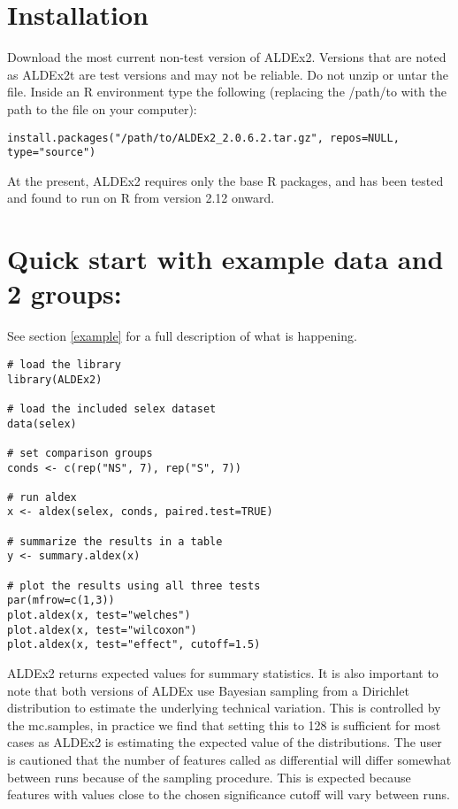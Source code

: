 \documentclass[11pt]{amsart}
\begin{document}
\section{Installation}
Download the most current non-test version of ALDEx2. Versions that are noted as ALDEx2t are test versions and may not be reliable. Do not unzip or untar the file. Inside an R environment type the following  (replacing the /path/to with the path to the file on your computer):
\begin{verbatim}
install.packages("/path/to/ALDEx2_2.0.6.2.tar.gz", repos=NULL, type="source")
\end{verbatim}
At the present, ALDEx2 requires only the base R packages, and has been tested and found to run on R from version 2.12 onward.

\section{Quick start with example data and 2 groups:}
See section \ref{example} for a full description of what is happening.\\
\begin{verbatim}
# load the library
library(ALDEx2)  

# load the included selex dataset
data(selex)  

# set comparison groups
conds <- c(rep("NS", 7), rep("S", 7))  

# run aldex
x <- aldex(selex, conds, paired.test=TRUE)  

# summarize the results in a table
y <- summary.aldex(x)  

# plot the results using all three tests
par(mfrow=c(1,3)) 
plot.aldex(x, test="welches")
plot.aldex(x, test="wilcoxon")
plot.aldex(x, test="effect", cutoff=1.5)
\end{verbatim}

ALDEx2 returns expected values for summary statistics. It is also important to note that both versions of ALDEx use Bayesian sampling from a Dirichlet distribution to estimate  the underlying technical variation. This is controlled by the mc.samples, in practice we find that setting this to 128 is sufficient for most cases as ALDEx2 is estimating the expected value of the distributions. The user is cautioned that the number of features called as differential will differ somewhat between runs because of the sampling procedure. This is expected because features with values close to the chosen significance cutoff will vary between runs. 
\end{document}
